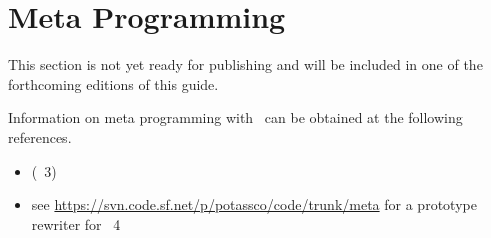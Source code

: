 \section{Meta Programming}\label{sec:meta}

This section is not yet ready for publishing
and will be included in one of the forthcoming editions of this guide.

Information on meta programming with \clingo\ can be obtained at the following references.

\begin{itemize}
\item \cite{gekasc11b} (\gringo\ 3)
\item see \url{https://svn.code.sf.net/p/potassco/code/trunk/meta} for a prototype rewriter for \gringo\ 4
\end{itemize}

